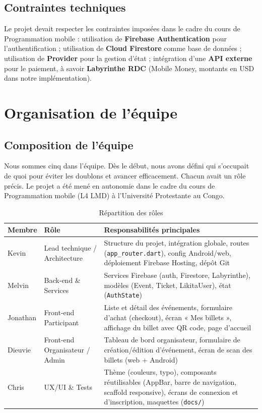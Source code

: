 \documentclass[11pt,a4paper,oneside]{article}
\begin{document}
\subsection{Contraintes techniques}

Le projet devait respecter les contraintes imposées dans le cadre du cours de Programmation mobile : utilisation de \textbf{Firebase Authentication} pour l'authentification ; utilisation de \textbf{Cloud Firestore} comme base de données ; utilisation de \textbf{Provider} pour la gestion d'état ; intégration d'une \textbf{API externe} pour le paiement, à savoir \textbf{Labyrinthe RDC} (Mobile Money, montants en USD dans notre implémentation).

\section{Organisation de l'équipe}
\label{sec:equipe}

\subsection{Composition de l'équipe}

Nous sommes cinq dans l'équipe. Dès le début, nous avons défini qui s'occupait de quoi pour éviter les doublons et avancer efficacement. Chacun avait un rôle précis. Le projet a été mené en autonomie dans le cadre du cours de Programmation mobile (L4 LMD) à l'Université Protestante au Congo.

\begin{table}[H]
\centering
\caption{Répartition des rôles}
\begin{tabularx}{\textwidth}{|l|l|X|}
\hline
\textbf{Membre} & \textbf{Rôle} & \textbf{Responsabilités principales} \\
\hline
Kevin & Lead technique / Architecture & Structure du projet, intégration globale, routes (\texttt{app\_router.dart}), config Android/web, déploiement Firebase Hosting, dépôt Git \\
\hline
Melvin & Back-end \& Services & Services Firebase (auth, Firestore, Labyrinthe), modèles (Event, Ticket, LikitaUser), état (\texttt{AuthState}) \\
\hline
Jonathan & Front-end Participant & Liste et détail des événements, formulaire d'achat (checkout), écran « Mes billets », affichage du billet avec QR code, page d'accueil \\
\hline
Dieuvie & Front-end Organisateur / Admin & Tableau de bord organisateur, formulaire de création/édition d'événement, écran de scan des billets (web + Android) \\
\hline
Chris & UX/UI \& Tests & Thème (couleurs, typo), composants réutilisables (AppBar, barre de navigation, scaffold responsive), écrans de connexion et d'inscription, maquettes (\texttt{docs/}) \\
\hline
\end{tabularx}
\end{table}
\end{document}
